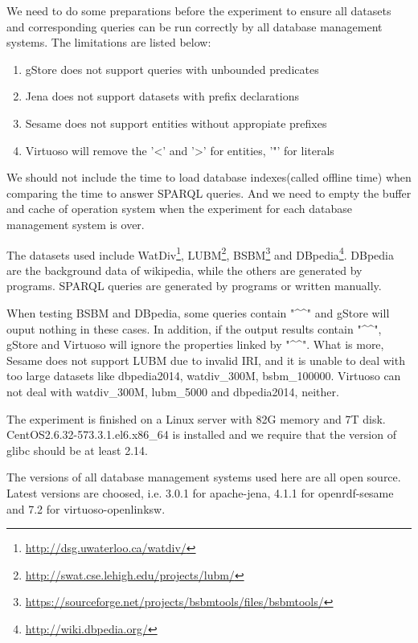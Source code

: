 \documentclass[titlepage, a4paper, 12pt] {article}
\begin{document}
We need to do some preparations before the experiment to ensure all datasets and corresponding queries 
can be run correctly by all database management systems. The limitations are listed below:

\begin{enumerate}
	\item gStore does not support queries with unbounded predicates
	\item Jena does not support datasets with prefix declarations
	\item Sesame does not support entities without appropiate prefixes
	\item Virtuoso will remove the '<' and '>' for entities, '"' for literals 
\end{enumerate} 

We should not include the time to load database indexes(called offline time) when comparing the time to answer SPARQL queries. And we need to empty the buffer and cache of operation system when the experiment for each database management system is over. 

The datasets used include WatDiv\footnote{\href{http://dsg.uwaterloo.ca/watdiv/}{http://dsg.uwaterloo.ca/watdiv/}}, 
LUBM\footnote{\href{http://swat.cse.lehigh.edu/projects/lubm/}{http://swat.cse.lehigh.edu/projects/lubm/}}, BSBM\footnote{\href{https://sourceforge.net/projects/bsbmtools/files/bsbmtools/}{https://sourceforge.net/projects/bsbmtools/files/bsbmtools/}} and DBpedia\footnote{\href{http://wiki.dbpedia.org/}{http://wiki.dbpedia.org/}}. DBpedia are the background data of wikipedia, 
while the others are generated by programs. SPARQL queries are generated by programs or written manually. 

When testing BSBM and DBpedia, some queries contain "\^{}\^{}" and gStore will ouput nothing in these cases.
In addition, if the output results contain "\^{}\^{}", gStore and Virtuoso will ignore the properties linked by "\^{}\^{}".
What is more, Sesame does not support LUBM due to invalid IRI, and it is unable to deal with too large datasets like dbpedia2014, watdiv\_300M, bsbm\_100000. Virtuoso can not deal with watdiv\_300M, lubm\_5000 and dbpedia2014, neither. 

\clearpage

The experiment is finished on a Linux server with 82G memory and 7T disk. CentOS2.6.32-573.3.1.el6.x86\_64 is 
installed and we require that the version of glibc should be at least 2.14. 

The versions of all database management systems used here are all open source. Latest versions are choosed, 
i.e. 3.0.1 for apache-jena, 4.1.1 for openrdf-sesame and 7.2 for virtuoso-openlinksw.
\end{document}
